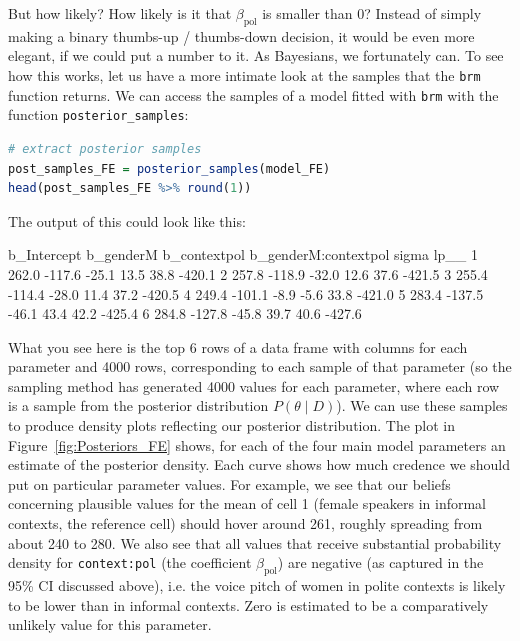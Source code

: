 \documentclass[nobib]{tufte-handout}
\begin{document}
But how likely? How likely is it that $\beta_{\text{pol}}$ is smaller than 0? Instead of simply making a binary thumbs-up / thumbs-down decision, it would be even more elegant, if we could put a number to it. As Bayesians, we fortunately can. To see how this works, let us have a more intimate look at the samples that the \texttt{brm} function returns. We can access the samples of a model fitted with \texttt{brm} with the function \texttt{posterior\_samples}:

\bigskip

\begin{minipage}[]{\textwidth}
\begin{lstlisting}[language=R]
# extract posterior samples 
post_samples_FE = posterior_samples(model_FE)
head(post_samples_FE %>% round(1))
\end{lstlisting}
\end{minipage}

The output of this could look like this:

\bigskip

\begin{minipage}[]{1.2\textwidth}
\begin{rc}
  b_Intercept b_genderM b_contextpol b_genderM:contextpol sigma   lp__
1       262.0    -117.6        -25.1                 13.5  38.8 -420.1
2       257.8    -118.9        -32.0                 12.6  37.6 -421.5
3       255.4    -114.4        -28.0                 11.4  37.2 -420.5
4       249.4    -101.1         -8.9                 -5.6  33.8 -421.0
5       283.4    -137.5        -46.1                 43.4  42.2 -425.4
6       284.8    -127.8        -45.8                 39.7  40.6 -427.6
\end{rc}
\end{minipage}

What you see here is the top 6 rows of a data frame with columns for each parameter and 4000 rows, corresponding to each sample of that parameter (so the sampling method has generated 4000 values for each parameter, where each row is a sample from the posterior distribution $P(\theta \mid D)$).
%
%
We can use these samples to produce density plots reflecting our posterior distribution. The plot in Figure~\ref{fig:Posteriors_FE}
shows, for each of the four main model parameters an estimate of the posterior density. Each
curve shows how much credence we should put on particular parameter values. For example, we see
that our beliefs concerning plausible values for the mean of cell 1 (female speakers in informal
contexts, the reference cell) should hover around 261, roughly spreading from about 240 to 280.
We also see that all values that receive substantial probability density for \texttt{context:pol} (the coefficient $\beta_{\text{pol}}$) are negative (as captured in the 95\% CI discussed above), i.e. the voice pitch of women in polite contexts is likely to be lower than in informal contexts. Zero is estimated to be a comparatively unlikely value for this parameter.
\end{document}
